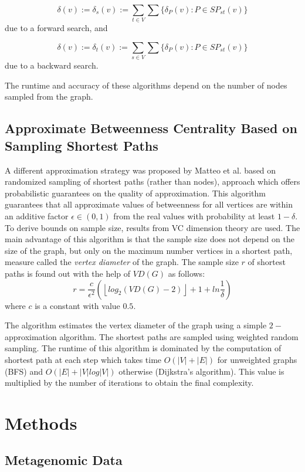 \documentclass[runningheads,a4paper]{llncs}
\begin{document}
$$\delta(v) := \delta_{s}(v) := \sum_{t \in V}\sum \{\delta_{P}(v):  P \in SP_{st}(v)\}$$
due to a forward search, and 

$$\delta(v) := \delta_{t}(v) := \sum_{s \in V}\sum \{\delta_{P}(v):  P \in SP_{st}(v)\}$$
due to a backward search. 

The runtime and accuracy of these algorithms depend on the number of nodes sampled from the graph.

\subsection*{Approximate Betweenness Centrality Based on Sampling Shortest Paths}
A different approximation strategy was proposed by Matteo et al. \cite{matteo} based on randomized sampling of shortest paths (rather than nodes), approach which offers probabilistic guarantees on the quality of approximation. This algorithm guarantees that all approximate values of betweenness for all vertices are within an additive factor $\epsilon \in (0,1)$ from the real values with probability at least $1-\delta$. To derive bounds on sample size, results from VC dimension theory\cite{vc} are used. The main advantage of this algorithm is that the sample size does not depend on the size of the graph, but only on the maximum number vertices in a shortest path, measure called the \textit{vertex diameter} of the graph. The sample size $r$ of shortest paths is found out with the help of $VD(G)$ as follows:
$$
r = \frac{c}{\epsilon^{2}}(\left\lfloor{log_{2}(VD(G) - 2)}\right\rfloor + 1 + ln\frac{1}{\delta})
$$ 
where $c$ is a constant with value $0.5$. 

The algorithm estimates the vertex diameter of the graph using a simple $2-$approximation algorithm. The shortest paths are sampled using weighted random sampling. The runtime of this algorithm is dominated by the computation of shortest path at each step which takes time $O(|V| + |E|)$ for unweighted graphs (BFS) and $O(|E| + |V|log|V|)$ otherwise (Dijkstra's algorithm). This value is multiplied by the number of iterations to obtain the final complexity.


\section{Methods}


\subsection*{Metagenomic Data}
\end{document}

